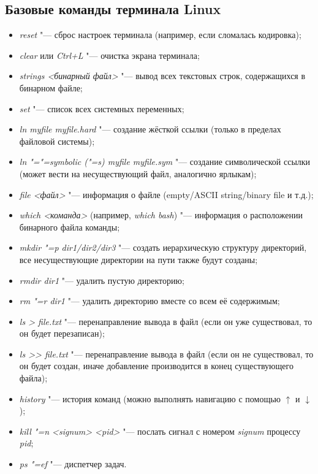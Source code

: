 \subsection{Базовые команды терминала Linux}

\begin{itemize}
	\item \textit{reset} "--- сброс настроек терминала (например, если сломалась кодировка);
	\item \textit{clear} или \textit{Ctrl+L} "--- очистка экрана терминала;
	\item \textit{strings <бинарный файл>} "--- вывод всех текстовых строк, содержащихся в бинарном файле;
	\item \textit{set} "--- список всех системных переменных;
	\item \textit{ln myfile myfile.hard} "--- создание жёсткой ссылки (только в пределах файловой системы);
	\item \textit{ln "="=symbolic ("=s) myfile myfile.sym} "--- создание символической ссылки (может вести на несуществующий файл, аналогично ярлыкам);
	\item \textit{file <файл>} "--- информация о файле (empty/ASCII string/binary file и т.д.);
	\item \textit{which <команда>} (например, \textit{which bash}) "--- информация о расположении бинарного файла команды;
	\item \textit{mkdir "=p dir1/dir2/dir3} "--- создать иерархическую структуру директорий, все несуществующие директории на пути также будут созданы;
	\item \textit{rmdir dir1} "--- удалить пустую директорию;
	\item \textit{rm "=r dir1} "--- удалить директорию вместе со всем её содержимым;
	\item \textit{ls {>} file.txt} "--- перенаправление вывода в файл (если он уже существовал, то он будет перезаписан);
	\item \textit{ls {>}{>} file.txt} "--- перенаправление вывода в файл (если он не существовал, то он будет создан, иначе добавление производится в конец существующего файла);
	\item \textit{history} "--- история команд (можно выполнять навигацию с помощью $\uparrow$ и $\downarrow$);
	\item \textit{kill "=n <signum> <pid>} "--- послать сигнал с номером \textit{signum} процессу \textit{pid};
	\item \textit{ps "=ef} "--- диспетчер задач.
\end{itemize}

